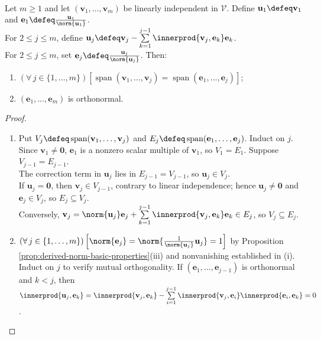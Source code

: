 \begin{theorem} \label{thm:gram-schmidt-process} \\
Let $m\geq1$ and let $(\mathbf{v}_1,\ldots,\mathbf{v}_m)$ be linearly independent in $\mathcal{V}$. Define $\mathbf{u}_1\defeq\mathbf{v}_1$ and $\mathbf{e}_1\defeq\frac{\mathbf{u}_1}{\norm{\mathbf{u}_1}}$.\\
For $2\leq j\leq m$, define $\mathbf{u}_j\defeq\mathbf{v}_j-\sum\limits_{k=1}^{j-1}\innerprod{\mathbf{v}_j,\mathbf{e}_k}\mathbf{e}_k$.\\
For $2\leq j\leq m$, set $\mathbf{e}_j\defeq\frac{\mathbf{u}_j}{\norm{\mathbf{u}_j}}$. Then:
\begin{enumerate}[label=(\roman*)]
\setlength{\itemsep}{0pt}
\item $(\forall\,j\in\{1,\ldots,m\})[\operatorname{span}(\mathbf{v}_1,\ldots,\mathbf{v}_j)=\operatorname{span}(\mathbf{e}_1,\ldots,\mathbf{e}_j)]$;
\item $(\mathbf{e}_1,\ldots,\mathbf{e}_m)$ is orthonormal.
\end{enumerate}
\begin{proof}
\begin{enumerate}[label=(\roman*)]
\setlength{\itemsep}{0pt}
\item[$(i)$] Put $V_j\defeq\operatorname{span}(\mathbf{v}_1,\ldots,\mathbf{v}_j)$ and $E_j\defeq\operatorname{span}(\mathbf{e}_1,\ldots,\mathbf{e}_j)$. Induct on $j$.\\
Since $\mathbf{v}_1\neq\mathbf{0}$, $\mathbf{e}_1$ is a nonzero scalar multiple of $\mathbf{v}_1$, so $V_1=E_1$. Suppose $V_{j-1}=E_{j-1}$.\\
The correction term in $\mathbf{u}_j$ lies in $E_{j-1}=V_{j-1}$, so $\mathbf{u}_j\in V_j$.\\
If $\mathbf{u}_j=\mathbf{0}$, then $\mathbf{v}_j\in V_{j-1}$, contrary to linear independence; hence $\mathbf{u}_j\neq\mathbf{0}$ and $\mathbf{e}_j\in V_j$, so $E_j\subseteq V_j$.\\
Conversely, $\mathbf{v}_j=\norm{\mathbf{u}_j}\mathbf{e}_j+\sum\limits_{k=1}^{j-1}\innerprod{\mathbf{v}_j,\mathbf{e}_k}\mathbf{e}_k\in E_j$, so $V_j\subseteq E_j$.
\item[$(ii)$] $(\forall\,j\in\{1,\ldots,m\})\left[\norm{\mathbf{e}_j}=\norm{\frac{1}{\norm{\mathbf{u}_j}}\mathbf{u}_j}=1\right]$ by Proposition \ref{prop:derived-norm-basic-properties}(iii) and nonvanishing established in (i). Induct on $j$ to verify mutual orthogonality. If $(\mathbf{e}_1,\ldots,\mathbf{e}_{j-1})$ is orthonormal and $k<j$, then $\innerprod{\mathbf{u}_j,\mathbf{e}_k}=\innerprod{\mathbf{v}_j,\mathbf{e}_k}-\sum\limits_{i=1}^{j-1}\innerprod{\mathbf{v}_j,\mathbf{e}_i}\innerprod{\mathbf{e}_i,\mathbf{e}_k}=0$.\\

\end{enumerate}
\end{proof}
\end{theorem}
